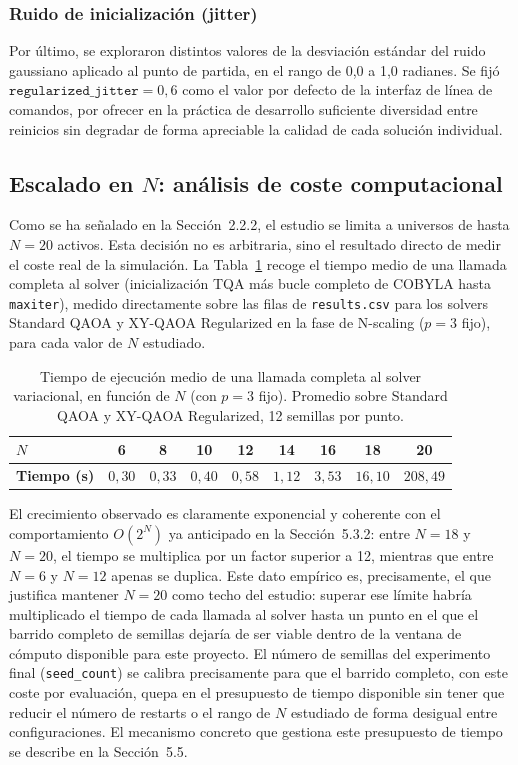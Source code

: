\subsubsection{Ruido de inicialización (jitter)}

Por último, se exploraron distintos valores de la desviación estándar del ruido gaussiano aplicado al punto de partida, en el rango de 0{,}0 a 1{,}0 radianes. Se fijó $\texttt{regularized\_jitter}=0{,}6$ como el valor por defecto de la interfaz de línea de comandos, por ofrecer en la práctica de desarrollo suficiente diversidad entre reinicios sin degradar de forma apreciable la calidad de cada solución individual.

\subsection{Escalado en $N$: análisis de coste computacional}
\label{sec:coste-computacional}

Como se ha señalado en la Sección~2.2.2, el estudio se limita a universos de hasta $N=20$ activos. Esta decisión no es arbitraria, sino el resultado directo de medir el coste real de la simulación. La Tabla~\ref{tab:tiempos-N} recoge el tiempo medio de una llamada completa al solver (inicialización TQA más bucle completo de COBYLA hasta \texttt{maxiter}), medido directamente sobre las filas de \texttt{results.csv} para los solvers Standard QAOA y XY-QAOA Regularized en la fase de N-scaling ($p=3$ fijo), para cada valor de $N$ estudiado.

\begin{table}[htbp]
\centering
\caption{Tiempo de ejecución medio de una llamada completa al solver variacional, en función de $N$ (con $p=3$ fijo). Promedio sobre Standard QAOA y XY-QAOA Regularized, 12 semillas por punto.}
\label{tab:tiempos-N}
\begin{tabular}{lcccccccc}
\toprule
\textbf{$N$} & 6 & 8 & 10 & 12 & 14 & 16 & 18 & 20 \\
\midrule
\textbf{Tiempo (s)} & $0{,}30$ & $0{,}33$ & $0{,}40$ & $0{,}58$ & $1{,}12$ & $3{,}53$ & $16{,}10$ & $208{,}49$ \\
\bottomrule
\end{tabular}
\end{table}

El crecimiento observado es claramente exponencial y coherente con el comportamiento $O(2^N)$ ya anticipado en la Sección~5.3.2: entre $N=18$ y $N=20$, el tiempo se multiplica por un factor superior a 12, mientras que entre $N=6$ y $N=12$ apenas se duplica. Este dato empírico es, precisamente, el que justifica mantener $N=20$ como techo del estudio: superar ese límite habría multiplicado el tiempo de cada llamada al solver hasta un punto en el que el barrido completo de semillas dejaría de ser viable dentro de la ventana de cómputo disponible para este proyecto. El número de semillas del experimento final (\texttt{seed\_count}) se calibra precisamente para que el barrido completo, con este coste por evaluación, quepa en el presupuesto de tiempo disponible sin tener que reducir el número de restarts o el rango de $N$ estudiado de forma desigual entre configuraciones. El mecanismo concreto que gestiona este presupuesto de tiempo se describe en la Sección~5.5.

